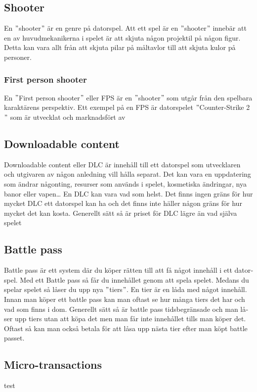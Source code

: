 \documentclass[11p]{article}
\begin{document}
\begin{otherlanguage}{swedish}
    \subsection{Shooter}
    En \("\)shooter\("\) är en genre på datorspel.
    Att ett spel är en \("\)shooter\("\) innebär att en av huvudmekanikerna i spelet är att skjuta någon projektil på någon figur.
    Detta kan vara allt från att skjuta pilar på måltavlor till att skjuta kulor på personer.

    \subsubsection{First person shooter}
    En \("\)First person shooter\("\) eller FPS är en \("\)shooter\("\) som utgår från den spelbara karaktärens perspektiv.
    Ett exempel på en FPS är datorspelet \("\)Counter-Strike 2\("\) som är utvecklat och marknadsfört av \textcite{CounterStrike}

    \subsection{Downloadable content}
    Downloadable content eller DLC är innehåll till ett datorspel som utvecklaren och utgivaren av någon anledning vill hålla separat.
    Det kan vara en uppdatering som ändrar någonting, resurser som används i spelet, kosmetiska ändringar, nya banor eller vapen\ldots
    En DLC kan vara vad som helst.
    Det finns ingen gräns för hur mycket DLC ett datorspel kan ha och det finns inte häller någon gräns för hur mycket det kan kosta.
    Generellt sätt så är priset för DLC lägre än vad själva spelet

    \subsection{Battle pass}
    Battle pass är ett system där du köper rätten till att få något innehåll i ett datorspel.
    Med ett Battle pass så får du innehållet genom att spela spelet.
    Medans du spelar spelet så låser du upp nya \("\)tiers\("\).
    En tier är en låda med något innehåll.
    Innan man köper ett battle pass kan man oftast se hur många tiers det har och vad som finns i dom.
    Generellt sätt så är battle pass tidsbegränsade och man låser upp tiers utan att köpa det men man får inte innehållet tills man köper det.
    Oftast så kan man också betala för att låsa upp nästa tier efter man köpt battle passet.

    \subsection{Micro-transactions}
    test


\end{otherlanguage}
\end{document}
